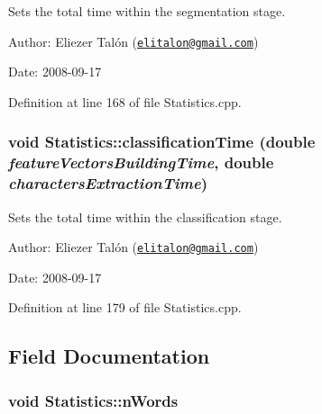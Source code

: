 Sets the total time within the segmentation stage. 

\begin{Desc}
\item[Author:]Eliezer Talón (\href{mailto:elitalon@gmail.com}{\tt elitalon@gmail.com}) \end{Desc}
\begin{Desc}
\item[Date:]2008-09-17 \end{Desc}


Definition at line 168 of file Statistics.cpp.\hypertarget{class_statistics_59bf0acb599fbfb44211669a32f0cce6}{
\subsubsection[classificationTime]{\setlength{\rightskip}{0pt plus 5cm}void Statistics::classificationTime (double {\em featureVectorsBuildingTime}, \/  double {\em charactersExtractionTime})}}
\label{class_statistics_59bf0acb599fbfb44211669a32f0cce6}


Sets the total time within the classification stage. 

\begin{Desc}
\item[Author:]Eliezer Talón (\href{mailto:elitalon@gmail.com}{\tt elitalon@gmail.com}) \end{Desc}
\begin{Desc}
\item[Date:]2008-09-17 \end{Desc}


Definition at line 179 of file Statistics.cpp.

\subsection{Field Documentation}
\hypertarget{class_statistics_cef381529a0baef3870133f42b6aa8dd}{
\subsubsection[nWords]{\setlength{\rightskip}{0pt plus 5cm}void {\bf Statistics::nWords}}}
\label{class_statistics_cef381529a0baef3870133f42b6aa8dd}


